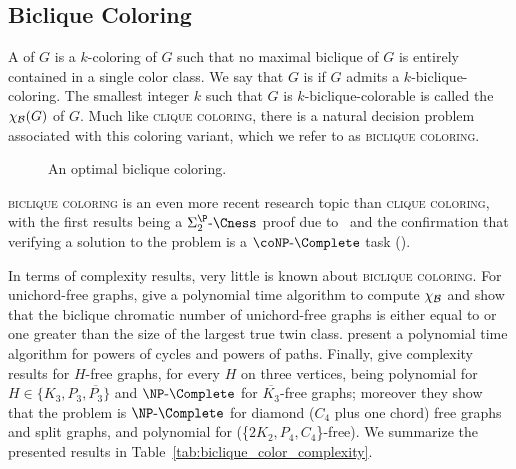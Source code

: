 \subsection{Biclique Coloring}
A  of $G$ is a $k$-coloring of $G$ such that no maximal biclique of $G$ is entirely contained in a single color class.
We say that $G$ is  if $G$ admits a $k$-biclique-coloring.
The smallest integer $k$ such that $G$ is $k$-biclique-colorable is called the  $\chi_{\mathcal{B}}(G)$ of $G$.
Much like \textsc{clique coloring}, there is a natural decision problem associated with this coloring variant, which we refer to as \textsc{biclique coloring}.



\begin{figure}[!htb]
    \centering
    \caption{An optimal biclique coloring.}
    \label{fig:biclique_color}
\end{figure}


\textsc{biclique coloring} is an even more recent research topic than \textsc{clique coloring}, with the first results being a $\SiP{2}\text{-}\Cness$ proof due to~\citep{biclique_coloring_complexity} and the confirmation that verifying a solution to the problem is a $\coNP\text{-}\Complete$ task (\cite{biclique_coloring_verification}).

In terms of complexity results, very little is known about \textsc{biclique coloring}.
For unichord-free graphs, \citep{unichord_coloring} give a polynomial time algorithm to compute $\chi_{\mathcal{B}}$ and show that the biclique chromatic number of unichord-free graphs is either equal to or one greater than the size of the largest true twin class.
\citep{biclique_coloring_verification} present a polynomial time algorithm for powers of cycles and powers of paths.
Finally, \citep{biclique_coloring_complexity} give complexity results for $H$-free graphs, for every $H$ on three vertices, being polynomial for $H \in \{K_3, P_3, \overline{P_3}\}$ and $\NPc$ for $\overline{K_3}$-free graphs;
moreover they show that the problem is $\NPc$ for diamond ($C_4$ plus one chord) free graphs and split graphs, and polynomial for  (\{$2K_2,P_4,C_4$\}-free).
We summarize the presented results in Table~\ref{tab:biclique_color_complexity}.

